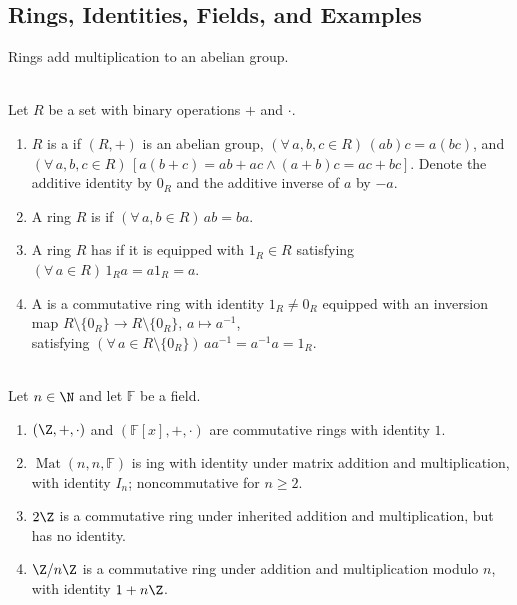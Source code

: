 \subsection{Rings, Identities, Fields, and Examples}

Rings add multiplication to an abelian group.

\begin{definition} \label{def:ring-commutative-identity-field} \\
Let $R$ be a set with binary operations $+$ and $\cdot$.
\begin{enumerate}[label=(\roman*)]
\setlength{\itemsep}{0pt}
\item $R$ is a  if $(R,+)$ is an abelian group, $(\forall\,a,b,c\in R)\,(ab)c=a(bc)$, and $(\forall\,a,b,c\in R)\,[a(b+c)=ab+ac\land(a+b)c=ac+bc]$. Denote the additive identity by $0_R$ and the additive inverse of $a$ by $-a$.
\item A ring $R$ is  if $(\forall\,a,b\in R)\,ab=ba$.
\item A ring $R$ has  if it is equipped with $1_R\in R$ satisfying $(\forall\,a\in R)\,1_Ra=a1_R=a$.
\item A  is a commutative ring with identity $1_R\neq0_R$ equipped with an inversion map $R\setminus\{0_R\}\to R\setminus\{0_R\}$, $a\mapsto a^{-1}$,\\
satisfying $(\forall\,a\in R\setminus\{0_R\})\,aa^{-1}=a^{-1}a=1_R$.
\end{enumerate}
\end{definition}

\begin{example} \label{ex:basic-rings} \\
Let $n\in\N$ and let $\mathbb{F}$ be a field.
\begin{enumerate}[label=(\roman*)]
\setlength{\itemsep}{0pt}
\item $(\Z,+,\cdot)$ and $(\mathbb{F}[x],+,\cdot)$ are commutative rings with identity $1$.
\item $\operatorname{Mat}(n,n,\mathbb{F})$ is ing with identity under matrix addition and multiplication, with identity $I_n$; noncommutative for $n\geq2$.
\item $2\Z$ is a commutative ring under inherited addition and multiplication, but has no identity.
\item $\Z/n\Z$ is a commutative ring under addition and multiplication modulo $n$, with identity $1+n\Z$.
\end{enumerate}
\end{example}
